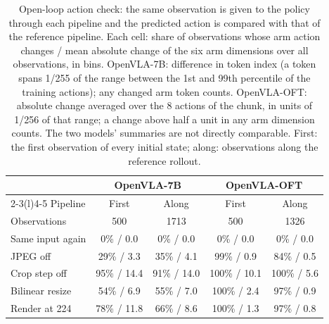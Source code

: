 \begin{table}[t]
\caption{Open-loop action check: the same observation is given to the policy through each pipeline and the predicted action is compared with that of the reference pipeline. Each cell: share of observations whose arm action changes / mean absolute change of the six arm dimensions over all observations, in bins. OpenVLA-7B: difference in token index (a token spans 1/255 of the range between the 1st and 99th percentile of the training actions); any changed arm token counts. OpenVLA-OFT: absolute change averaged over the 8 actions of the chunk, in units of 1/256 of that range; a change above half a unit in any arm dimension counts. The two models' summaries are not directly comparable. First: the first observation of every initial state; along: observations along the reference rollout.}
\label{tab:openloop}
\centering
\footnotesize
\setlength{\tabcolsep}{2.5pt}
\begin{tabular}{@{}lcccc@{}}
\toprule
 & \multicolumn{2}{c}{OpenVLA-7B} & \multicolumn{2}{c}{OpenVLA-OFT} \\
\cmidrule(lr){2-3}\cmidrule(l){4-5}
Pipeline & First & Along & First & Along \\
Observations & 500 & 1713 & 500 & 1326 \\
\midrule
Same input again & 0\% / 0.0 & 0\% / 0.0 & 0\% / 0.0 & 0\% / 0.0 \\
JPEG off & 29\% / 3.3 & 35\% / 4.1 & 99\% / 0.9 & 84\% / 0.5 \\
Crop step off & 95\% / 14.4 & 91\% / 14.0 & 100\% / 10.1 & 100\% / 5.6 \\
Bilinear resize & 54\% / 6.9 & 55\% / 7.0 & 100\% / 2.4 & 97\% / 0.9 \\
Render at 224 & 78\% / 11.8 & 66\% / 8.6 & 100\% / 1.3 & 97\% / 0.8 \\
\bottomrule
\end{tabular}
\end{table}
